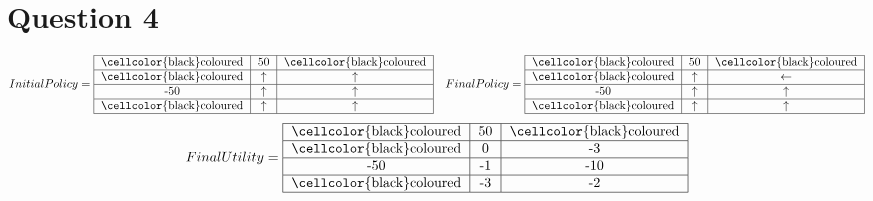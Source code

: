 \documentclass[letter, 10pt]{article}
\begin{document}
\section*{Question 4}
\begin{equation*}
    Initial Policy = \begin{tabular}{ |c|c|c| } 
                    \hline
                    \cellcolor{black}coloured & 50 & \cellcolor{black}coloured\\
                    \hline
                    \cellcolor{black}coloured & $\uparrow$ & $\uparrow$\\
                    \hline
                    -50 & $\uparrow$ & $\uparrow$\\
                    \hline
                    \cellcolor{black}coloured & $\uparrow$ & $\uparrow$\\
                    \hline
                    \end{tabular}\quad 
    Final Policy =   \begin{tabular}{ |c|c|c| } 
                    \hline
                    \cellcolor{black}coloured & 50 & \cellcolor{black}coloured\\
                    \hline
                    \cellcolor{black}coloured & $\uparrow$ & $\leftarrow$\\
                    \hline
                    -50 & $\uparrow$ & $\uparrow$\\
                    \hline
                    \cellcolor{black}coloured & $\uparrow$ & $\uparrow$\\
                    \hline
                    \end{tabular}
\end{equation*}
\begin{equation*}
    Final Utility = \begin{tabular}{ |c|c|c| } 
                    \hline
                    \cellcolor{black}coloured & 50 & \cellcolor{black}coloured\\
                    \hline
                    \cellcolor{black}coloured & 0 & -3\\
                    \hline
                    -50 & -1 & -10\\
                    \hline
                    \cellcolor{black}coloured & -3 & -2\\
                    \hline
                    \end{tabular}
\end{equation*}
\end{document}
